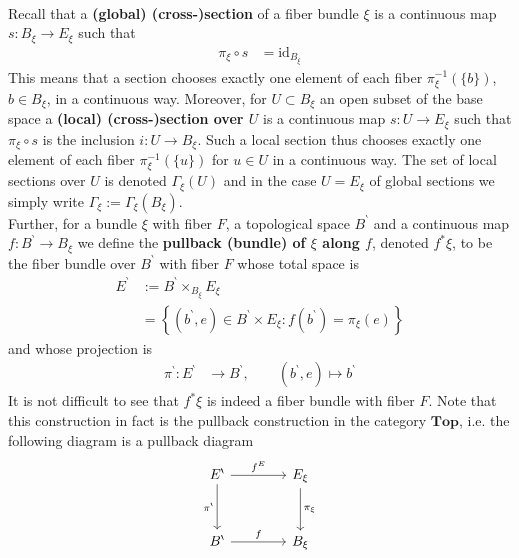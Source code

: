 \\
Recall that a \textbf{(global) (cross-)section} of a fiber bundle $\xi$ is a continuous map $s \colon B_{\xi} \to E_{\xi}$ such that
\begin{align*}
  \pi_{\xi}
  \circ
  s
  &=
  \mathrm{id}_{B_{\xi}}
\end{align*}
This means that a section chooses exactly one element of each fiber $\pi_{\xi}^{-1}(\lbrace b \rbrace)$, $b \in B_{\xi}$, in a continuous way. Moreover, for $U \subset B_{\xi}$ an open subset of the base space a \textbf{(local) (cross-)section over $U$} is a continuous map $s \colon U \to E_{\xi}$ such that $\pi_{\xi} \circ s$ is the inclusion $i \colon U \to B_{\xi}$. Such a local section thus chooses exactly one element of each fiber $\pi_{\xi}^{-1}(\lbrace u \rbrace)$ for $u \in U$ in a continuous way. The set of local sections over $U$ is denoted $\Gamma_{\xi}(U)$ and in the case $U = E_{\xi}$ of global sections we simply write $\Gamma_{\xi} := \Gamma_{\xi}(B_{\xi})$.
\\
Further, for a bundle $\xi$ with fiber $F$, a topological space $B^{\backprime}$ and a continuous map $f \colon B^{\backprime} \to B_{\xi}$ we define the \textbf{pullback (bundle) of $\xi$ along $f$}, denoted $f^{\ast}\xi$, to be the fiber bundle over $B^{\backprime}$ with fiber $F$ whose total space is
\begin{align*}
  E^{\backprime}
  &:=
  B^{\backprime}
  \times_{B_{\xi}}
  E_{\xi}
  \\
  &=
  \left\lbrace
    (b^{\backprime},e)
    \in
    B^{\backprime}
    \times
    E_{\xi}
    \colon
    f(b^{\backprime})
    =
    \pi_{\xi}(e)
  \right\rbrace
\end{align*}
and whose projection is
\begin{align*}
  \pi^{\backprime}
  \colon
  E^{\backprime}
  &\to
  B^{\backprime}
  ,\qquad
  (b^{\backprime},e)
  \mapsto
  b^{\backprime}
\end{align*}
It is not difficult to see that $f^{\ast}\xi$ is indeed a fiber bundle with fiber $F$. Note that this construction in fact is the pullback construction in the category $\mathbf{Top}$, i.e. the following diagram is a pullback diagram
\begin{equation*}
\begin{tikzcd}[row sep=3em,column sep=4em]
  E^{\backprime}
  \ar{r}{f^{E}}
  \ar{d}[swap]{\pi^{\backprime}}
  &
  E_{\xi}
  \ar{d}{\pi_{\xi}}
  \\
  B^{\backprime}
  \ar{r}{f}
  &
  B_{\xi}
\end{tikzcd}
\end{equation*}
